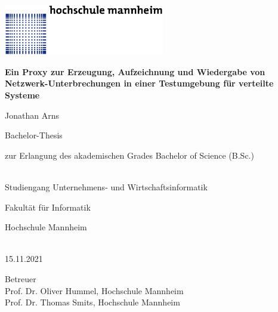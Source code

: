 \documentclass[12pt,a4paper]{report}
\begin{document}
\begin{titlepage}
	\noindent\includegraphics[width=7cm]{img/hs_logo.png}
	\begin{center}
		\sffamily
		\Large
		\textbf{Ein Proxy zur Erzeugung, Aufzeichnung und Wiedergabe von Netzwerk-Unterbrechungen in einer Testumgebung für verteilte Systeme}

		\vspace{1cm}

		\large
		\begin{Large}Jonathan Arns\end{Large}

		\vspace{1.5cm}


		Bachelor-Thesis\\
		\begin{small}zur Erlangung des akademischen Grades Bachelor of Science (B.Sc.)\end{small}\\
		Studiengang Unternehmens- und Wirtschaftsinformatik

		\vspace{1cm}

		Fakultät für Informatik\\
		\begin{Large}Hochschule Mannheim\end{Large}\\

		\vspace{1cm}
		15.11.2021

		\vfill

		Betreuer\\
		Prof. Dr. Oliver Hummel, Hochschule Mannheim\\
		Prof. Dr. Thomas Smits, Hochschule Mannheim\\
	\end{center}
\end{titlepage}


\setlength{\parindent}{0em}
\setlength{\parskip}{0.6em}
\end{document}
